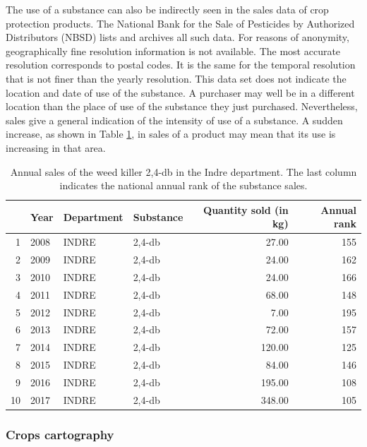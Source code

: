 The use of a substance can also be indirectly seen in the sales data of crop protection products. The National Bank for the Sale of Pesticides by Authorized Distributors (NBSD) \cite{BNVD} lists and archives all such data. For reasons of anonymity, geographically fine resolution information is not available. The most accurate resolution corresponds to postal codes. It is the same for the temporal resolution that is not finer than the yearly resolution. This data set does not indicate the location and date of use of the substance. A purchaser may well be in a different location than the place of use of the substance they just purchased. Nevertheless, sales give a general indication of the intensity of use of a substance. A sudden increase, as shown in Table \ref{tab:bnvd}, in sales of a product may mean that its use is increasing in that area.  

\begin{table}[ht]\label{tab:bnvd}
\centering
\begin{tabular}{rlllrr}
  \hline
 & Year & Department & Substance & Quantity sold (in kg) & Annual rank \\ 
  \hline
1 & 2008 & INDRE & 2,4-db & 27.00 & 155 \\ 
  2 & 2009 & INDRE & 2,4-db & 24.00 & 162 \\ 
  3 & 2010 & INDRE & 2,4-db & 24.00 & 166 \\ 
  4 & 2011 & INDRE & 2,4-db & 68.00 & 148 \\ 
  5 & 2012 & INDRE & 2,4-db & 7.00 & 195 \\ 
  6 & 2013 & INDRE & 2,4-db & 72.00 & 157 \\ 
  7 & 2014 & INDRE & 2,4-db & 120.00 & 125 \\ 
  8 & 2015 & INDRE & 2,4-db & 84.00 & 146 \\ 
  9 & 2016 & INDRE & 2,4-db & 195.00 & 108 \\ 
  10 & 2017 & INDRE & 2,4-db & 348.00 & 105 \\ 
   \hline
\end{tabular}
   \caption{Annual sales of the weed killer 2,4-db in the Indre department. The last column indicates the national annual rank of the substance sales.}
\end{table}

\subsubsection{Crops cartography}

